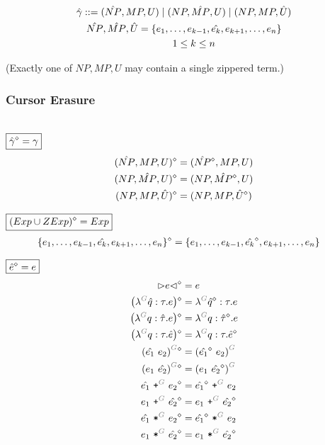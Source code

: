 \begin{gather*}
  \arraycolsep=0pt
  \begin{array}{lll}
    \hat{\gamma} & {}::={} &
      (\hat{NP}, MP, U)
      \mid (NP, \hat{MP}, U)
      \mid (NP, MP, \hat{U})
  \end{array} \\
  \hat{NP}, \hat{MP}, \hat{U} = \SetOf{e_1, \ldots, e_{k-1}, \hat{e_k}, e_{k+1}, \ldots, e_n} \\
  \qquad 1 \leq k \leq n
\end{gather*}

(Exactly one of $NP, MP, U$ may contain a single zippered term.)


\subsubsection{Cursor Erasure}\hspace*{\fill} \\

\noindent $\boxed{\hat{\gamma}\mathclose{}^{\diamond}\mathclose{} = \gamma}$
%
\begin{align*}
  (\hat{NP}, MP, U)\mathclose{}^{\diamond}\mathclose{} &= (\hat{NP}\mathclose{}^{\diamond}\mathclose{}, MP, U) \\
  (NP, \hat{MP}, U)\mathclose{}^{\diamond}\mathclose{} &= (NP, \hat{MP}\mathclose{}^{\diamond}\mathclose{}, U) \\
  (NP, MP, \hat{U})\mathclose{}^{\diamond}\mathclose{} &= (NP, MP, \hat{U}\mathclose{}^{\diamond}\mathclose{})
\end{align*}

\noindent $\boxed{\left(Exp \cup ZExp\right)\mathclose{}^{\diamond}\mathclose{} = Exp}$
%
\begin{align*}
  \left\{e_1, \ldots, e_{k-1}, \hat{e_k}, e_{k+1}, \ldots, e_n\right\}\mathclose{}^{\diamond}\mathclose{} &= \left\{e_1, \ldots, e_{k-1}, \hat{e_k}\mathclose{}^{\diamond}\mathclose{}, e_{k+1}, \ldots, e_n\right\}
\end{align*}

\noindent $\boxed{\hat{e}\mathclose{}^{\diamond}\mathclose{} = e}$
%
\begin{align*}
  \erase{\cursor{e}} &= e \\
  \erase{\left(\eFun{G}{\hat{q}}{\tau}{e}\right)} &= \eFun{G}{\erase{\hat{q}}}{\tau}{e} \\
  \erase{\left(\eFun{G}{q}{\hat{\tau}}{e}\right)} &= \eFun{G}{q}{\erase{\hat{\tau}}}{e} \\
  \erase{\left(\eFun{G}{q}{\tau}{\hat{e}}\right)} &= \eFun{G}{q}{\tau}{\erase{\hat{e}}} \\
  \erase{\eApp{G}{\hat{e_1}}{e_2}} &= \eApp{G}{\erase{\hat{e_1}}}{e_2} \\
  \erase{\eApp{G}{e_1}{\hat{e_2}}} &= \eApp{G}{e_1}{\erase{\hat{e_2}}} \\
  \erase{\ePlus{G}{\hat{e_1}}{e_2}} &= \ePlus{G}{\erase{\hat{e_1}}}{e_2} \\
  \erase{\ePlus{G}{e_1}{\hat{e_2}}} &= \ePlus{G}{e_1}{\erase{\hat{e_2}}} \\
  \erase{\eTimes{G}{\hat{e_1}}{e_2}} &= \eTimes{G}{\erase{\hat{e_1}}}{e_2} \\
  \erase{\eTimes{G}{e_1}{\hat{e_2}}} &= \eTimes{G}{e_1}{\erase{\hat{e_2}}}
\end{align*}

